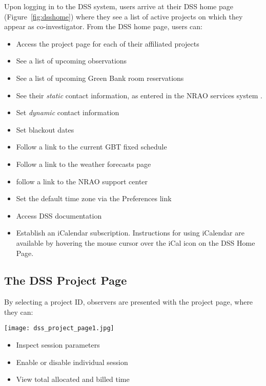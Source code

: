 Upon logging in to the \gls{DSS} system, users arrive at their \gls{DSS} home page
(Figure~\ref{fig:dsshome}) where they see a list of active projects on which they
appear as co-investigator. From the \gls{DSS} home page, users can:
\begin{itemize}[itemsep=1pt]
\item Access the project page for each of their affiliated projects
\item See a list of upcoming observations
\item See a list of upcoming Green Bank room reservations
\item See their {\it static} contact information, as entered in the \gls{NRAO}
      services system .
\item Set {\it dynamic} contact information
\item Set blackout dates
\item Follow a link to the current \gls{GBT} fixed schedule
\item Follow a link to the weather forecasts page
\item follow a link to the \gls{NRAO} support center
\item Set the default time zone via the Preferences link
\item Access \gls{DSS} documentation
\item Establish an iCalendar subscription. Instructions for using iCalendar are available
by hovering the mouse cursor over the iCal icon on the \gls{DSS} Home Page.
\end{itemize}

\newpage

\subsection{The DSS Project Page}

By selecting a project ID, observers are presented with the project page,
where they can:

\noindent\begin{minipage}{0.6\linewidth}
\texttt{[image: dss\_project\_page1.jpg]}
\end{minipage}\hfill
\begin{minipage}{0.385\linewidth}
\begin{itemize}[leftmargin=*]
\vspace{2cm}
\item Inspect session parameters
\item Enable or disable individual session
\item View total allocated and billed time
\end{itemize}
\end{minipage}


